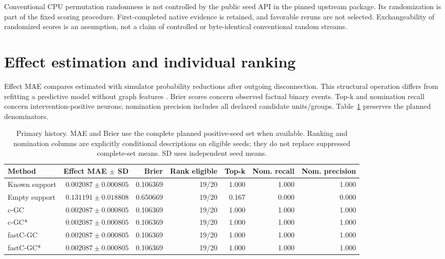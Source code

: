 \documentclass[11pt,a4paper]{article}
\begin{document}
Conventional CPU permutation randomness is not controlled by the public seed API
in the pinned upstream package. Its randomization is part of the fixed scoring
procedure. First-completed native evidence is retained, and favorable reruns are
not selected. Exchangeability of randomized scores is an assumption, not a claim
of controlled or byte-identical conventional random streams.

\section{Effect estimation and individual ranking}
Effect MAE compares estimated with simulator probability reductions after outgoing
disconnection. This structural operation differs from refitting a predictive
model without graph features \citep{pearl2010causalinference,williamson2023importance}.
Brier scores concern observed factual binary events. Top-k and nomination recall
concern intervention-positive neurons; nomination precision includes all declared
candidate units/groups. Table~\ref{tab:primary} preserves the planned denominators.

\begin{table}[htbp]\centering\scriptsize\setlength{\tabcolsep}{3.5pt}
\caption{Primary history. MAE and Brier use the complete planned positive-seed set
when available. Ranking and nomination columns are explicitly conditional
descriptions on eligible seeds; they do not replace suppressed complete-set means.
SD uses independent seed means.}
\label{tab:primary}
\begin{tabular}{@{}lrrrrrr@{}}\toprule
Method & Effect MAE $\pm$ SD & Brier & Rank eligible & Top-k & Nom. recall & Nom. precision\\\midrule
Known support & $0.002087 \pm 0.000805$ & 0.106369 & 19/20 & 1.000 & 1.000 & 1.000 \\
Empty support & $0.131191 \pm 0.018808$ & 0.650669 & 19/20 & 0.167 & 0.000 & 0.000 \\
c-GC & $0.002087 \pm 0.000805$ & 0.106369 & 19/20 & 1.000 & 1.000 & 1.000 \\
c-GC* & $0.002087 \pm 0.000805$ & 0.106369 & 19/20 & 1.000 & 1.000 & 1.000 \\
fastC-GC & $0.002087 \pm 0.000805$ & 0.106369 & 19/20 & 1.000 & 1.000 & 1.000 \\
fastC-GC* & $0.002087 \pm 0.000805$ & 0.106369 & 19/20 & 1.000 & 1.000 & 1.000 \\
\bottomrule\end{tabular}\end{table}
\end{document}
